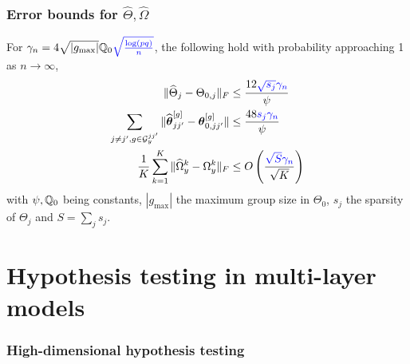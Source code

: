 \documentclass[10pt]{beamer}
\theoremstyle{definition}
\DeclareMathOperator*{\supp}{\text{supp}}
\begin{document}

\begin{frame}
\frametitle{Error bounds for $\widehat \Theta, \widehat\Omega$}

For $\gamma_n = 4 \sqrt{| g_{\max}|} {\mathbb{Q}}_0 {\color{blue} \sqrt{ \frac{ \log(pq)}{n}}}$, the following hold with probability approaching 1 as $n \rightarrow \infty$,
%
\begin{align*}
\| \widehat \Theta_j - \Theta_{0,j} \|_F & \leq \frac{12 {\color{blue} \sqrt{s_j} \gamma_n}}{\psi} \\
\sum_{j \neq j', g \in {\cal{G}}_y^{jj'}} \| \widehat {{\boldsymbol{\theta}}}_{jj'}^{[g]} - {\boldsymbol{\theta}}_{0,jj'}^{[g]} \| & \leq \frac{48 {\color{blue} s_j \gamma_n}}{\psi} \\
\frac{1}{K} \sum_{k=1}^K \| \widehat \Omega_y^k - \Omega_y^k \|_F & \leq
O \left( \frac{{\color{blue} \sqrt S \gamma_n }}{\sqrt K} \right)\\
\end{align*}
%
with $\psi, {\mathbb{Q}}_0$ being constants, $| g_{\max} |$ the maximum group size in $\Theta_0$, $s_j$ the sparsity of $\Theta_j$ and $S = \sum_j s_j$.
\end{frame}

\section{Hypothesis testing in multi-layer models}

\begin{frame}
\frametitle{High-dimensional hypothesis testing}

\end{frame}
\end{document}
